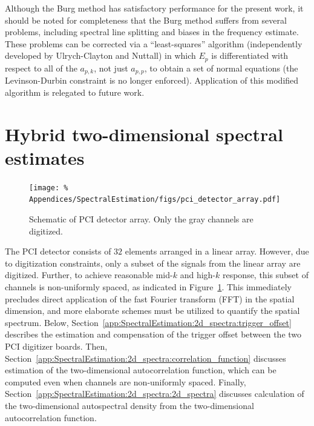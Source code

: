 Although the Burg method has satisfactory performance for the present work,
it should be noted for completeness that
the Burg method suffers from several problems,
including spectral line splitting and biases in the frequency estimate.
These problems can be corrected via
a ``least-squares'' algorithm
(independently developed by Ulrych-Clayton and Nuttall)
in which $E_p$ is differentiated with respect to all of the $a_{p,k}$,
not just $a_{p,p}$,
to obtain a set of normal equations
(the Levinson-Durbin constraint is no longer enforced).
Application of this modified algorithm
is relegated to future work.


\section{Hybrid two-dimensional spectral estimates}
\label{app:SpectralEstimation:2d_spectra}
\begin{figure}
  \centering
  \texttt{[image: \%
    Appendices/SpectralEstimation/figs/pci\_detector\_array.pdf]}
  \caption[Schematic of PCI detector array]{%
    Schematic of PCI detector array.
    Only the gray channels are digitized.
  }
  \label{fig:SpectralEstimation:pci_detector_array}
\end{figure}

The PCI detector consists of $32$ elements arranged in a linear array.
However, due to digitization constraints,
only a subset of the signals from the linear array are digitized.
Further, to achieve reasonable mid-$k$ and high-$k$ response,
this subset of channels is non-uniformly spaced, as indicated in
Figure~\ref{fig:SpectralEstimation:pci_detector_array}.
This immediately precludes direct application
of the fast Fourier transform (FFT) in the spatial dimension, and
more elaborate schemes must be utilized
to quantify the spatial spectrum.
Below, Section~\ref{app:SpectralEstimation:2d_spectra:trigger_offset}
describes the estimation and compensation
of the trigger offset between the two PCI digitizer boards.
Then, Section~\ref{app:SpectralEstimation:2d_spectra:correlation_function}
discusses estimation of the two-dimensional autocorrelation function,
which can be computed even when channels are non-uniformly spaced.
Finally, Section~\ref{app:SpectralEstimation:2d_spectra:2d_spectra}
discusses calculation of the two-dimensional autospectral density
from the two-dimensional autocorrelation function.



